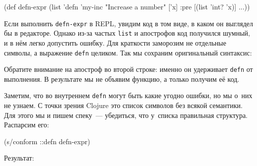\begin{english}
  \begin{clojure}
(def defn-expr
  (list 'defn 'my-inc
        "Increase a number"
        ['x]
        {:pre [(list 'int? 'x)]} ...))
  \end{clojure}
\end{english}

Если выполнить \verb|defn-expr| в REPL, увидим код в том виде, в каком он
выглядел бы в редакторе. Однако из-за частых \verb|list| и апострофов код
получился шумный, и в нём легко допустить ошибку. Для краткости заморозим не
отдельные символы, а выражение \verb|defn| целиком. Так мы сохраним оригинальный
синтаксис:

\begin{english}
\end{english}

Обратите внимание на апостроф во второй строке: именно он удерживает \verb|defn|
от выполнения. В результате мы не объявим функцию, а только получим её код.

Заметим, что во внутреннем \verb|defn| могут быть какие угодно ошибки, но мы
о~них не узнаем. С точки зрения Clojure это список символов без всякой
семантики. Для этого мы и пишем спеку~--- убедиться, что у~списка правильная
структура. Распарсим его:

\begin{english}
  \begin{clojure}
(s/conform ::defn defn-expr)
  \end{clojure}
\end{english}

\noindent
Результат:

\ifx\DEVICETYPE\MOBILE

\begin{english}
\end{english}

\else

\begin{english}
\end{english}

